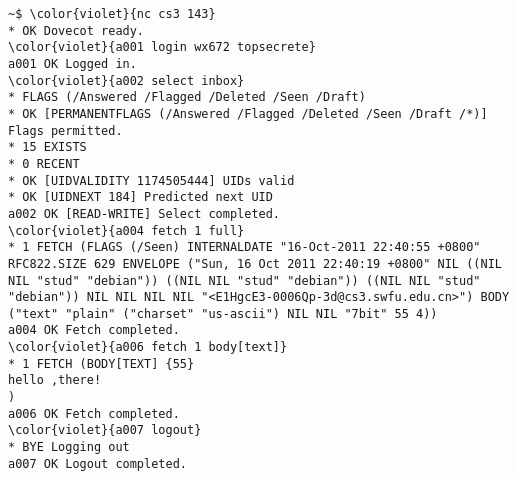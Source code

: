 \documentclass[varwidth,crop]{standalone}
\begin{document}
\begin{Verbatim}[commandchars=\\\{\}]
~$ \color{violet}{nc cs3 143}
* OK Dovecot ready.
\color{violet}{a001 login wx672 topsecrete}
a001 OK Logged in.
\color{violet}{a002 select inbox}
* FLAGS (/Answered /Flagged /Deleted /Seen /Draft)
* OK [PERMANENTFLAGS (/Answered /Flagged /Deleted /Seen /Draft /*)] Flags permitted.
* 15 EXISTS
* 0 RECENT
* OK [UIDVALIDITY 1174505444] UIDs valid
* OK [UIDNEXT 184] Predicted next UID
a002 OK [READ-WRITE] Select completed.
\color{violet}{a004 fetch 1 full}
* 1 FETCH (FLAGS (/Seen) INTERNALDATE "16-Oct-2011 22:40:55 +0800" RFC822.SIZE 629 ENVELOPE ("Sun, 16 Oct 2011 22:40:19 +0800" NIL ((NIL NIL "stud" "debian")) ((NIL NIL "stud" "debian")) ((NIL NIL "stud" "debian")) NIL NIL NIL NIL "<E1HgcE3-0006Qp-3d@cs3.swfu.edu.cn>") BODY ("text" "plain" ("charset" "us-ascii") NIL NIL "7bit" 55 4))
a004 OK Fetch completed.
\color{violet}{a006 fetch 1 body[text]}
* 1 FETCH (BODY[TEXT] {55}
hello ,there!
)
a006 OK Fetch completed.
\color{violet}{a007 logout}
* BYE Logging out
a007 OK Logout completed.
\end{Verbatim}
\end{document}
